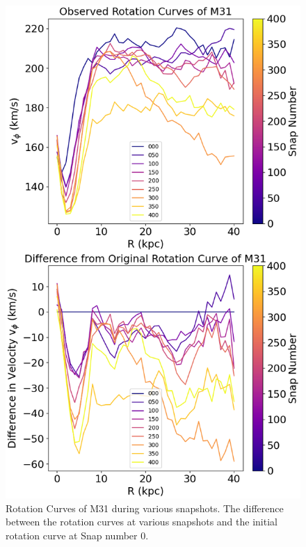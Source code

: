 \documentclass[twocolumn,linenumbers,trackchanges]{aastex7}
\begin{document}
\begin{figure}
    \centering
    \includegraphics[width=1.0\linewidth]{M31_Diff_Curves.png}
    \caption{Rotation Curves of M31 during various snapshots. The difference between the rotation curves at various snapshots and the initial rotation curve at Snap number 0.}
    \label{fig:Diff_M31}
\end{figure}
\end{document}
